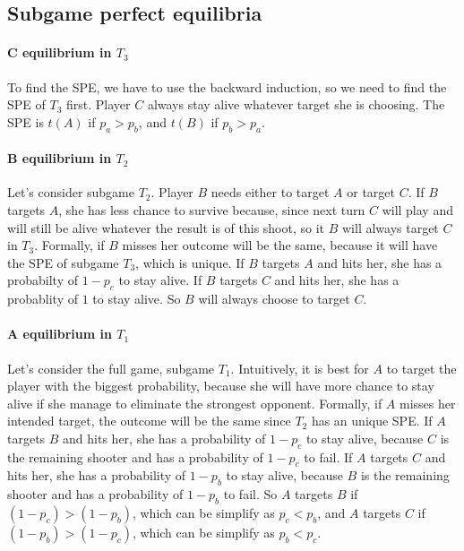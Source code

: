 \documentclass[letterpaper]{article}
\begin{document}
\subsection{Subgame perfect equilibria}

\paragraph{C equilibrium in $T_3$}

To find the SPE, we have to use the backward induction, so we need to find
the SPE of $T_3$ first. Player $C$ always stay alive whatever target she is
choosing. The SPE is $t(A)$ if $p_a > p_b$, and $t(B)$ if $p_b > p_a$.

\paragraph{B equilibrium in $T_2$}

Let's consider subgame $T_2$. Player $B$ needs either to target $A$
or target $C$. If $B$ targets $A$, she has less chance to survive because,
since next turn $C$ will play and will still be alive whatever the result is
of this shoot, so it $B$ will always target $C$ in $T_3$.
Formally, if $B$ misses her outcome will be the same, because it will have
the SPE of subgame $T_3$, which is unique.
If $B$ targets $A$ and hits her, she has
a probabilty of $1 - p_c$ to stay alive. If $B$ targets $C$ and hits her, she
has a probablity of $1$ to stay alive. So $B$ will always choose to target $C$.

\paragraph{A equilibrium in $T_1$}

Let's consider the full game, subgame $T_1$. Intuitively, it is best for
$A$ to target the player with the biggest probability, because she will have
more chance to stay alive if she manage to eliminate the strongest opponent.
Formally, if $A$ misses her intended target, the outcome will be the same
since $T_2$ has an unique SPE. If $A$ targets $B$ and hits her, she has
a probability of $1 - p_c$ to stay alive, because $C$ is
the remaining shooter and has a probability of $1 - p_c$ to fail.
If $A$ targets $C$ and hits her,
she has a probability of $1 - p_b$ to stay alive, because $B$ is
the remaining shooter and has a probability of $1 - p_b$ to fail.
So $A$ targets $B$ if
$ (1 - p_c) > (1 - p_b)$, which can be simplify as
$p_c < p_b$, and $A$ targets $C$
if $(1 - p_b) > (1 - p_c)$, which can be simplify as $p_b < p_c$.
\end{document}
